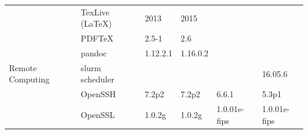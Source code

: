 \begin{table}[!ht]
{\begin{tabular}{ll|l|l|l|l|}
\rowcolor{gray!25}
\cellcolor{white}                                                      & \multicolumn{1}{|l|}{TexLive (\LaTeX)}       & 2013                                                                & 2015                                                              &                                                                        &                                                \\
\cline{2-6}
\cellcolor{white}                                                      & \multicolumn{1}{|l|}{PDF\TeX}                & 2.5-1                                                               & 2.6                                                               &                                                                        &                                                \\
\cline{2-6}

\rowcolor{gray!25}
\cellcolor{white}                                                      & \multicolumn{1}{|l|}{pandoc}                 & 1.12.2.1                                                            & 1.16.0.2                                                          &                                                                        &                                                \\
\hline
\cellcolor{white} Remote Computing                                     & \multicolumn{1}{|l|}{slurm scheduler}        &                                                                     &                                                                   &                                                                        & 16.05.6                                        \\
\cline{2-6}

\rowcolor{gray!25}
\cellcolor{white}                                                      & \multicolumn{1}{|l|}{OpenSSH}                & 7.2p2                                                               & 7.2p2                                                             & 6.6.1                                                                  & 5.3p1                                          \\
\cline{2-6}
\cellcolor{white}                                                      & \multicolumn{1}{|l|}{OpenSSL}                & 1.0.2g                                                              & 1.0.2g                                                            & 1.0.01e-fips                                                           & 1.0.01e-fips                                   \\
\cline{2-6}


\end{tabular}}
\end{table}
